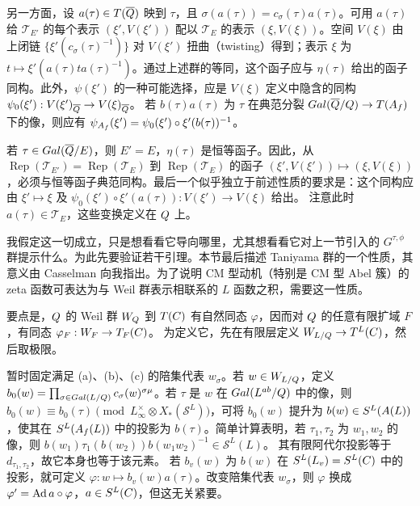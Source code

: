 另一方面，设 $a(\tau)\in T(\overline{Q})$ 映到 $\tau$，且
$\sigma(a(\tau))=c_\sigma(\tau)a(\tau)$。可用 $a(\tau)$ 给
$\mathcal T_{E'}$ 的每个表示 $(\xi',V(\xi'))$ 配以 $\mathcal T_E$ 的表示
$(\xi,V(\xi))$。空间 $V(\xi)$ 由上闭链
$\{\xi'(c_\sigma(\tau)^{-1})\}$ 对 $V(\xi')$ 扭曲（twisting）得到；表示
$\xi$ 为 $t\mapsto\xi'(a(\tau)ta(\tau)^{-1})$。通过上述群的等同，这个函子应与
$\eta(\tau)$ 给出的函子同构。此外，$\psi(\xi')$ 的一种可能选择，应是
$V(\xi)$ 定义中隐含的同构
$\psi_0(\xi'):V(\xi')_{\overline{Q}}\to V(\xi)_{\overline{Q}}$。
若 $b(\tau)a(\tau)$ 为 $\tau$ 在典范分裂
$Gal(\overline{Q}/Q)\to T(A_f)$ 下的像，则应有
$\psi_{A_f}(\xi')=\psi_0(\xi')\circ\xi'(b(\tau))^{-1}$。

若 $\tau\in Gal(\overline{Q}/E)$，则 $E'=E$，$\eta(\tau)$ 是恒等函子。因此，从
$\operatorname{Rep}(\mathcal T_{E'})=\operatorname{Rep}(\mathcal T_E)$ 到
$\operatorname{Rep}(\mathcal T_E)$ 的函子 $(\xi',V(\xi'))\mapsto(\xi,V(\xi))$，必须与恒等函子典范同构。最后一个似乎独立于前述性质的要求是：这个同构应由
$\xi'\mapsto\xi$ 及 $\psi_0(\xi')\circ\xi'(a(\tau)):V(\xi')\to V(\xi)$ 给出。
注意此时 $a(\tau)\in\mathcal T_E$，这些变换定义在 $Q$ 上。

我假定这一切成立，只是想看看它导向哪里，尤其想看看它对上一节引入的
$G^{\tau,\phi}$ 群提示什么。为此先要验证若干引理。本节最后描述 Taniyama 群的一个性质，其意义由
Casselman 向我指出。为了说明 CM 型动机（特别是 CM 型 Abel 簇）的 zeta 函数可表达为与
Weil 群表示相联系的 $L$ 函数之积，需要这一性质。

要点是，$Q$ 的 Weil 群 $W_Q$ 到 $T(C)$ 有自然同态 $\varphi$，因而对
$Q$ 的任意有限扩域 $F$，有同态 $\varphi_F:W_F\to T_F(C)$。
为定义它，先在有限层定义 $W_{L/Q}\to T^L(C)$，然后取极限。

暂时固定满足 (a)、(b)、(c) 的陪集代表 $w_\sigma$。若 $w\in W_{L/Q}$，定义
$b_0(w)=\prod_{\sigma\in Gal(L/Q)}c_\sigma(w)^{\sigma\mu}$。若 $\tau$ 是
$w$ 在 $Gal(L^{ab}/Q)$ 中的像，则
$b_0(w)\equiv b_0(\tau)\pmod{L_\infty^\times\otimes X_*(\mathcal S^L)}$，可将
$b_0(w)$ 提升为 $b(w)\in S^L(A(L))$，使其在
$S^L(A_f(L))$ 中的投影为 $b(\tau)$。简单计算表明，若
$\tau_1,\tau_2$ 为 $w_1,w_2$ 的像，则
$b(w_1)\tau_1(b(w_2))b(w_1w_2)^{-1}\in\mathcal S^L(L)$。
其有限阿代尔投影等于 $d_{\tau_1,\tau_2}$，故它本身也等于该元素。
若 $b_v(w)$ 为 $b(w)$ 在 $S^L(L_v)=S^L(C)$ 中的投影，就可定义
$\varphi:w\mapsto b_v(w)a(\tau)$。改变陪集代表 $w_\sigma$，则 $\varphi$ 换成
$\varphi'=\operatorname{Ad} a\circ\varphi$，$a\in S^L(C)$，但这无关紧要。

